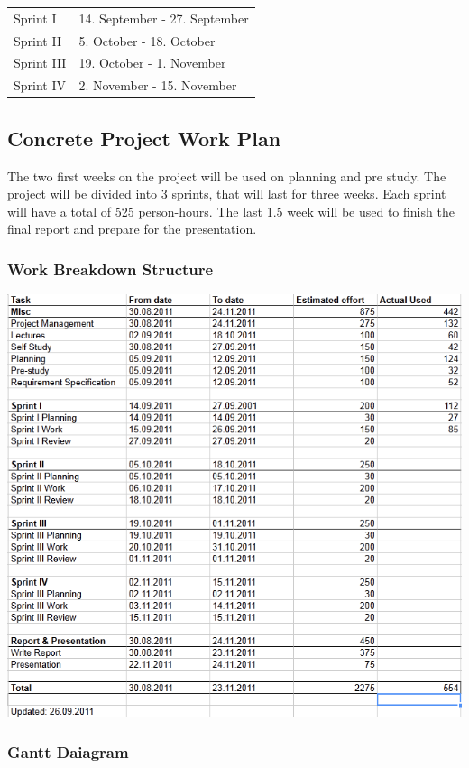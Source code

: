 \begin{tabular}{l  l}
	Sprint I & 14. September - 27. September \\
	Sprint II & 5. October - 18. October \\
	Sprint III & 19. October - 1. November  \\
	Sprint IV & 2. November - 15. November \\
\end{tabular}

\subsection{Concrete Project Work Plan}
The two first weeks on the project will be used on planning and pre study.
The project will be divided into 3 sprints, that will last for three weeks. Each sprint will have a total of 525 person-hours.
The last 1.5 week will be used to finish the final report and prepare for the presentation. 

\subsubsection{Work Breakdown Structure}

\includegraphics[scale=0.80]{./planning/img/wbs.png}

\subsubsection{Gantt Daiagram}

